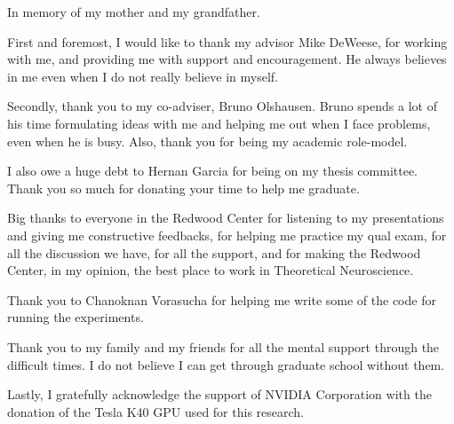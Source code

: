 \documentclass[oldfontcommands]{ucbthesis}
\begin{document}
\begin{frontmatter}

\begin{dedication}
\null\vfil
\begin{center}
In memory of my mother and my grandfather. \\\vspace{12pt}
\end{center}
\vfil\null
\end{dedication}


\tableofcontents
\clearpage
\listoffigures
\clearpage
\listoftables

\begin{acknowledgements}
First and foremost, I would like to thank my advisor Mike DeWeese, for working with me, and providing me with support and encouragement. He always believes in me even when I do not really believe in myself.

Secondly, thank you to my co-adviser, Bruno Olshausen. Bruno spends a lot of his time formulating ideas with me and helping me out when I face problems, even when he is busy. Also, thank you for being my academic role-model.

I also owe a huge debt to Hernan Garcia for being on my thesis committee. Thank you so much for donating your time to help me graduate.

Big thanks to everyone in the Redwood Center for listening to my presentations and giving me constructive feedbacks, for helping me practice my qual exam, for all the discussion we have, for all the support, and for making the Redwood Center, in my opinion, the best place to work in Theoretical Neuroscience.

Thank you to Chanoknan Vorasucha for helping me write some of the code for running the experiments. 

Thank you to my family and my friends for all the mental support through the difficult times. I do not believe I can get through graduate school without them.

Lastly, I gratefully acknowledge the support of NVIDIA Corporation with the donation of the Tesla K40 GPU used for this research.

\end{acknowledgements}

\end{frontmatter}

\pagestyle{headings}








\printbibliography
\end{document}
